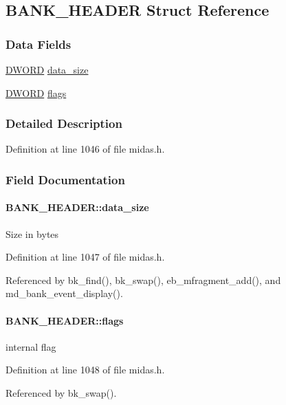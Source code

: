 \subsection{BANK\_\-HEADER Struct Reference}
\label{structBANK__HEADER}
\subsubsection*{Data Fields}
\begin{DoxyCompactItemize}
\item 
\hyperlink{vt2_8h_a798af1e30bc65f319c1a246cecf59e39}{DWORD} \hyperlink{structBANK__HEADER_a5e55c7a38deab349e4819d3ac2fcd971}{data\_\-size}
\item 
\hyperlink{vt2_8h_a798af1e30bc65f319c1a246cecf59e39}{DWORD} \hyperlink{structBANK__HEADER_a2e43050c8084b34fa5389bfd6945bb51}{flags}
\end{DoxyCompactItemize}


\subsubsection{Detailed Description}


Definition at line 1046 of file midas.h.

\subsubsection{Field Documentation}
\paragraph[{data\_\-size}]{ {\bf BANK\_\-HEADER::data\_\-size}}\hfill\label{structBANK__HEADER_a5e55c7a38deab349e4819d3ac2fcd971}
Size in bytes 

Definition at line 1047 of file midas.h.

Referenced by bk\_\-find(), bk\_\-swap(), eb\_\-mfragment\_\-add(), and md\_\-bank\_\-event\_\-display().
\paragraph[{flags}]{ {\bf BANK\_\-HEADER::flags}}\hfill\label{structBANK__HEADER_a2e43050c8084b34fa5389bfd6945bb51}
internal flag 

Definition at line 1048 of file midas.h.

Referenced by bk\_\-swap().